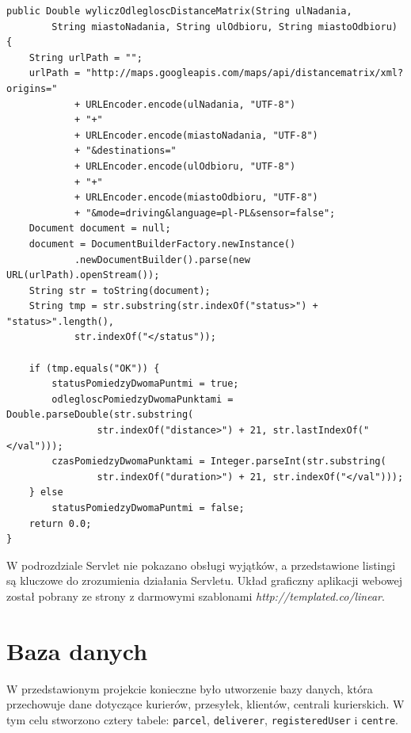 \documentclass[eng,printmode,oneside]{mgr}
\begin{document}
\begin{lstlisting}[caption=Metoda
wyliczOdlegloscDistanceMatrix() z
klasy
DistanceMatrix,label=lst:wyliczOdlegloscDistanceMatrix.DistanceMatrix.java] 
public Double wyliczOdlegloscDistanceMatrix(String ulNadania,
		String miastoNadania, String ulOdbioru, String miastoOdbioru) {
	String urlPath = "";
	urlPath = "http://maps.googleapis.com/maps/api/distancematrix/xml?origins="
			+ URLEncoder.encode(ulNadania, "UTF-8")
			+ "+"
			+ URLEncoder.encode(miastoNadania, "UTF-8")
			+ "&destinations="
			+ URLEncoder.encode(ulOdbioru, "UTF-8")
			+ "+"
			+ URLEncoder.encode(miastoOdbioru, "UTF-8")
			+ "&mode=driving&language=pl-PL&sensor=false";	
	Document document = null;
	document = DocumentBuilderFactory.newInstance()
			.newDocumentBuilder().parse(new URL(urlPath).openStream());	
	String str = toString(document);
	String tmp = str.substring(str.indexOf("status>") + "status>".length(),
			str.indexOf("</status"));

	if (tmp.equals("OK")) {
		statusPomiedzyDwomaPuntmi = true;
		odlegloscPomiedzyDwomaPunktami = Double.parseDouble(str.substring(
				str.indexOf("distance>") + 21, str.lastIndexOf("</val")));
		czasPomiedzyDwomaPunktami = Integer.parseInt(str.substring(
				str.indexOf("duration>") + 21, str.indexOf("</val")));
	} else
		statusPomiedzyDwomaPuntmi = false;
	return 0.0;
}
\end{lstlisting}

W podrozdziale Servlet nie pokazano obsługi wyjątków, a przedstawione listingi
są kluczowe do zrozumienia działania Servletu. Układ graficzny aplikacji webowej
został pobrany ze strony z darmowymi szablonami
{\textit{http://templated.co/linear}}.

\newpage
\section{Baza danych}

W przedstawionym projekcie konieczne było utworzenie bazy danych, która
przechowuje dane dotyczące kurierów, przesyłek, klientów, centrali kurierskich.
W tym celu stworzono cztery tabele: \texttt{parcel}, \texttt{deliverer},
\texttt{registeredUser} i \texttt{centre}.
\end{document}
